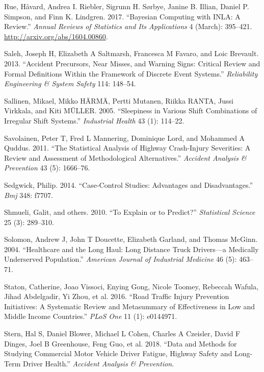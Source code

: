 \documentclass[12pt]{book}
\numberwithin{equation}{chapter}
\begin{document}
\leavevmode\hypertarget{ref-Rue2017}{}%
Rue, Håvard, Andrea I. Riebler, Sigrunn H. Sørbye, Janine B. Illian, Daniel P. Simpson, and Finn K. Lindgren. 2017. ``Bayesian Computing with INLA: A Review.'' \emph{Annual Reviews of Statistics and Its Applications} 4 (March): 395--421. \url{http://arxiv.org/abs/1604.00860}.

\leavevmode\hypertarget{ref-saleh2013accident}{}%
Saleh, Joseph H, Elizabeth A Saltmarsh, Francesca M Favaro, and Loic Brevault. 2013. ``Accident Precursors, Near Misses, and Warning Signs: Critical Review and Formal Definitions Within the Framework of Discrete Event Systems.'' \emph{Reliability Engineering \& System Safety} 114: 148--54.

\leavevmode\hypertarget{ref-sallinen2005sleepiness}{}%
Sallinen, Mikael, Mikko HÄRMÄ, Pertti Mutanen, Riikka RANTA, Jussi Virkkala, and Kiti MÜLLER. 2005. ``Sleepiness in Various Shift Combinations of Irregular Shift Systems.'' \emph{Industrial Health} 43 (1): 114--22.

\leavevmode\hypertarget{ref-savolainen2011statistical}{}%
Savolainen, Peter T, Fred L Mannering, Dominique Lord, and Mohammed A Quddus. 2011. ``The Statistical Analysis of Highway Crash-Injury Severities: A Review and Assessment of Methodological Alternatives.'' \emph{Accident Analysis \& Prevention} 43 (5): 1666--76.

\leavevmode\hypertarget{ref-sedgwick2014case}{}%
Sedgwick, Philip. 2014. ``Case-Control Studies: Advantages and Disadvantages.'' \emph{Bmj} 348: f7707.

\leavevmode\hypertarget{ref-shmueli2010explain}{}%
Shmueli, Galit, and others. 2010. ``To Explain or to Predict?'' \emph{Statistical Science} 25 (3): 289--310.

\leavevmode\hypertarget{ref-solomon2004healthcare}{}%
Solomon, Andrew J, John T Doucette, Elizabeth Garland, and Thomas McGinn. 2004. ``Healthcare and the Long Haul: Long Distance Truck Drivers---a Medically Underserved Population.'' \emph{American Journal of Industrial Medicine} 46 (5): 463--71.

\leavevmode\hypertarget{ref-staton2016road}{}%
Staton, Catherine, Joao Vissoci, Enying Gong, Nicole Toomey, Rebeccah Wafula, Jihad Abdelgadir, Yi Zhou, et al. 2016. ``Road Traffic Injury Prevention Initiatives: A Systematic Review and Metasummary of Effectiveness in Low and Middle Income Countries.'' \emph{PLoS One} 11 (1): e0144971.

\leavevmode\hypertarget{ref-stern2018data}{}%
Stern, Hal S, Daniel Blower, Michael L Cohen, Charles A Czeisler, David F Dinges, Joel B Greenhouse, Feng Guo, et al. 2018. ``Data and Methods for Studying Commercial Motor Vehicle Driver Fatigue, Highway Safety and Long-Term Driver Health.'' \emph{Accident Analysis \& Prevention}.
\end{document}
